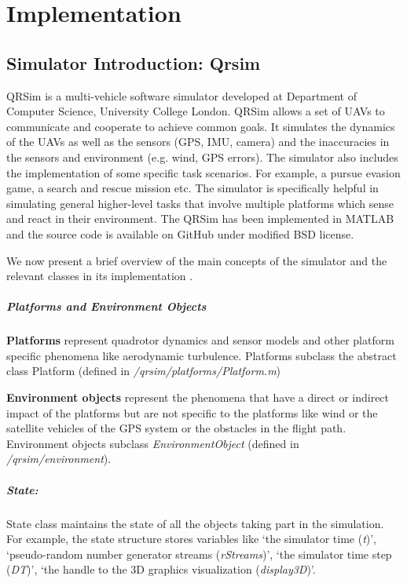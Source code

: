 \chapter{Implementation}

\section{Simulator Introduction: Qrsim} \label{qrsim_intro}
QRSim \cite{denardi2013rn} is a multi-vehicle software simulator developed at Department of Computer Science, University College London. QRSim allows a set of UAVs to communicate and cooperate to achieve common goals. It simulates the dynamics of the UAVs as well as the sensors (GPS, IMU, camera) and the inaccuracies in the sensors and environment (e.g. wind, GPS errors). The simulator also includes the implementation of some specific task scenarios. For example, a pursue evasion game, a search and rescue mission etc. The simulator is specifically helpful in simulating general higher-level tasks that involve multiple platforms which sense and react in their environment. The QRSim has been implemented in MATLAB and the source code is available on GitHub \cite{qrsim_github} under modified BSD license.

We now present a brief overview of the main concepts of the simulator and the relevant classes in its implementation \cite{qrsim_github_manual}.

\paragraph{Platforms and Environment Objects}
\textbf{Platforms} represent quadrotor dynamics and sensor models and other platform specific phenomena like aerodynamic turbulence. Platforms subclass the abstract class Platform (defined in \emph{/qrsim/platforms/Platform.m})

\textbf{Environment objects} represent the phenomena that have a direct or indirect impact of the platforms but are not specific to the platforms like wind or the satellite vehicles of the GPS system or the obstacles in the flight path. Environment objects subclass \emph{EnvironmentObject} (defined in \emph{/qrsim/environment}).
\paragraph{State:} State class maintains the state of all the objects taking part in the simulation. For example, the state structure stores variables like `the simulator time (\emph{t})', `pseudo-random number generator streams (\emph{rStreams})', `the simulator time step (\emph{DT})', `the handle to the 3D graphics visualization (\emph{display3D})'.
